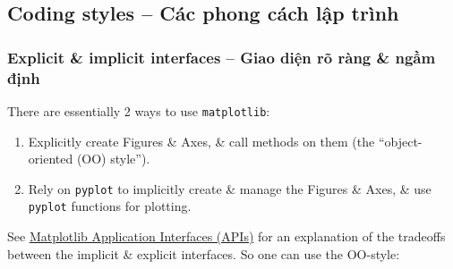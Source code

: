 \documentclass{article}
\begin{document}

\subsection{Coding styles -- Các phong cách lập trình}


\subsubsection{Explicit \& implicit interfaces -- Giao diện rõ ràng \& ngầm định}
There are essentially 2 ways to use {\tt matplotlib}:
\begin{enumerate}
    \item Explicitly create Figures \& Axes, \& call methods on them (the ``object-oriented (OO) style'').
    \item Rely on {\tt pyplot} to implicitly create \& manage the Figures \& Axes, \& use {\tt pyplot} functions for plotting.
\end{enumerate}
See \href{https://matplotlib.org/stable/users/explain/figure/api_interfaces.html#api-interfaces}{Matplotlib Application Interfaces (APIs)} for an explanation of the tradeoffs between the implicit \& explicit interfaces. So one can use the OO-style:
\end{document}
